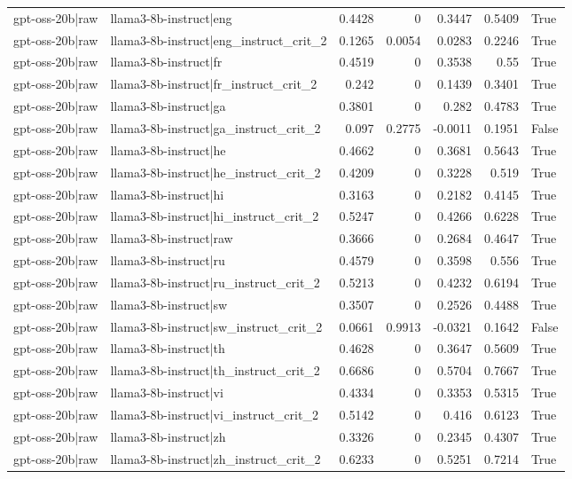 \begin{table}
\begin{tabular}{l l r r r r l}
gpt-oss-20b|raw & llama3-8b-instruct|eng & 0.4428 & 0 & 0.3447 & 0.5409 & True \\
gpt-oss-20b|raw & llama3-8b-instruct|eng_instruct_crit_2 & 0.1265 & 0.0054 & 0.0283 & 0.2246 & True \\
gpt-oss-20b|raw & llama3-8b-instruct|fr & 0.4519 & 0 & 0.3538 & 0.55 & True \\
gpt-oss-20b|raw & llama3-8b-instruct|fr_instruct_crit_2 & 0.242 & 0 & 0.1439 & 0.3401 & True \\
gpt-oss-20b|raw & llama3-8b-instruct|ga & 0.3801 & 0 & 0.282 & 0.4783 & True \\
gpt-oss-20b|raw & llama3-8b-instruct|ga_instruct_crit_2 & 0.097 & 0.2775 & -0.0011 & 0.1951 & False \\
gpt-oss-20b|raw & llama3-8b-instruct|he & 0.4662 & 0 & 0.3681 & 0.5643 & True \\
gpt-oss-20b|raw & llama3-8b-instruct|he_instruct_crit_2 & 0.4209 & 0 & 0.3228 & 0.519 & True \\
gpt-oss-20b|raw & llama3-8b-instruct|hi & 0.3163 & 0 & 0.2182 & 0.4145 & True \\
gpt-oss-20b|raw & llama3-8b-instruct|hi_instruct_crit_2 & 0.5247 & 0 & 0.4266 & 0.6228 & True \\
gpt-oss-20b|raw & llama3-8b-instruct|raw & 0.3666 & 0 & 0.2684 & 0.4647 & True \\
gpt-oss-20b|raw & llama3-8b-instruct|ru & 0.4579 & 0 & 0.3598 & 0.556 & True \\
gpt-oss-20b|raw & llama3-8b-instruct|ru_instruct_crit_2 & 0.5213 & 0 & 0.4232 & 0.6194 & True \\
gpt-oss-20b|raw & llama3-8b-instruct|sw & 0.3507 & 0 & 0.2526 & 0.4488 & True \\
gpt-oss-20b|raw & llama3-8b-instruct|sw_instruct_crit_2 & 0.0661 & 0.9913 & -0.0321 & 0.1642 & False \\
gpt-oss-20b|raw & llama3-8b-instruct|th & 0.4628 & 0 & 0.3647 & 0.5609 & True \\
gpt-oss-20b|raw & llama3-8b-instruct|th_instruct_crit_2 & 0.6686 & 0 & 0.5704 & 0.7667 & True \\
gpt-oss-20b|raw & llama3-8b-instruct|vi & 0.4334 & 0 & 0.3353 & 0.5315 & True \\
gpt-oss-20b|raw & llama3-8b-instruct|vi_instruct_crit_2 & 0.5142 & 0 & 0.416 & 0.6123 & True \\
gpt-oss-20b|raw & llama3-8b-instruct|zh & 0.3326 & 0 & 0.2345 & 0.4307 & True \\
gpt-oss-20b|raw & llama3-8b-instruct|zh_instruct_crit_2 & 0.6233 & 0 & 0.5251 & 0.7214 & True \\

\end{tabular}
\end{table}
